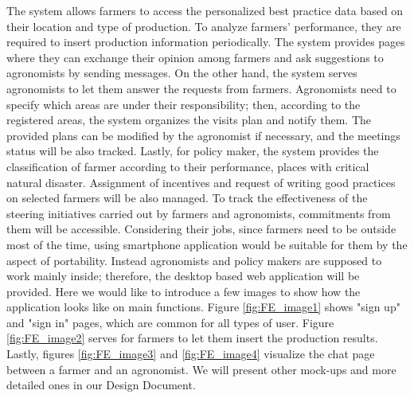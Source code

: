 
The system allows farmers to access the personalized best practice data based on their location and type of production. To analyze farmers' performance, they are required to insert production information periodically. The system provides pages where they can exchange their opinion among farmers and ask suggestions to agronomists by sending messages. 
\newline
\newline
On the other hand, the system serves agronomists to let them answer the requests from farmers. 
Agronomists need to specify which areas are under their responsibility; then, according to the registered areas, the system organizes the visits plan and notify them. The provided plans can be modified by the agronomist if necessary, and the meetings status will be also tracked.
\newline
\newline
Lastly, for policy maker, the system provides the classification of farmer according to their performance, places with critical natural disaster. Assignment of incentives and request of writing good practices on selected farmers will be also managed. To track the effectiveness of the steering initiatives carried out by farmers and agronomists, commitments from them will be accessible.
\newline
\newline
Considering their jobs, since farmers need to be outside most of the time, using smartphone application would be suitable for them by the aspect of portability. Instead agronomists and policy makers are supposed to work mainly inside; therefore, the desktop based web application will be provided. 
\newline
\newline
Here we would like to introduce a few images to show how the application looks like on main functions. Figure \ref{fig:FE_image1} shows "sign up" and "sign in" pages, which are common for all types of user. Figure \ref{fig:FE_image2} serves for farmers to let them insert the production results. Lastly, figures \ref{fig:FE_image3} and \ref{fig:FE_image4} visualize the chat page between a farmer and an agronomist. We will present other mock-ups and more detailed ones in our Design Document. 

